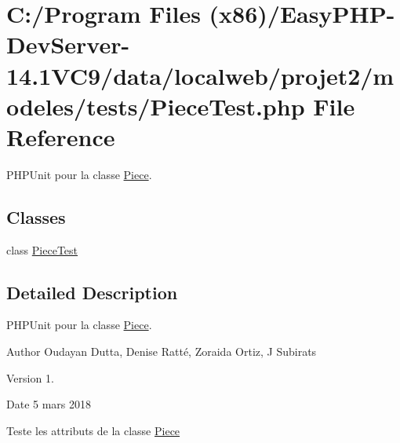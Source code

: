 \hypertarget{_piece_test_8php}{}\section{C\+:/\+Program Files (x86)/\+Easy\+P\+H\+P-\/\+Dev\+Server-\/14.1\+V\+C9/data/localweb/projet2/modeles/tests/\+Piece\+Test.php File Reference}
\label{_piece_test_8php}


P\+H\+P\+Unit pour la classe \hyperlink{class_piece}{Piece}.  


\subsection*{Classes}
\begin{DoxyCompactItemize}
\item 
class \hyperlink{class_piece_test}{Piece\+Test}
\end{DoxyCompactItemize}


\subsection{Detailed Description}
P\+H\+P\+Unit pour la classe \hyperlink{class_piece}{Piece}. 

\begin{DoxyAuthor}{Author}
Oudayan Dutta, Denise Ratté, Zoraida Ortiz, J Subirats 
\end{DoxyAuthor}
\begin{DoxyVersion}{Version}
1. 
\end{DoxyVersion}
\begin{DoxyDate}{Date}
5 mars 2018
\end{DoxyDate}
Teste les attributs de la classe \hyperlink{class_piece}{Piece} 